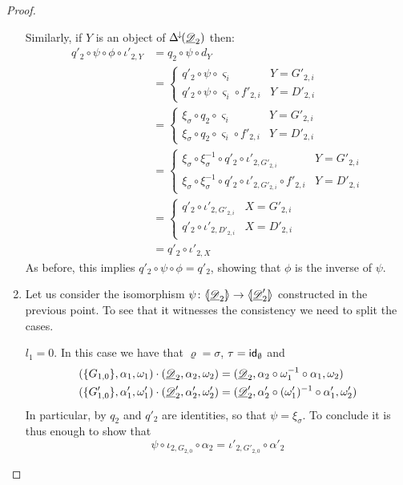 \begin{proof}
\begin{enumerate}
		Similarly, if  $Y$ is an object of $\Delta^{\hspace{-1pt}\downarrow\hspace{-1pt}}(\underline{\mathscr{D}}_2)$ then:
				\begin{align*}
			q'_2\circ \psi \circ \phi \circ \iota'_{2, Y}&=q_2\circ \psi \circ d_Y\\&=\begin{cases}
				q'_2\circ \psi \circ \varsigma_i & Y=G'_{2,i}\\
				q'_2\circ \psi \circ \varsigma_{i} \circ f'_{2,i} & Y=D'_{2,i}
			\end{cases}\\&=\begin{cases}
				\xi_{\sigma} \circ q_2\circ \varsigma_i & Y=G'_{2,i}\\
				\xi_{\sigma} \circ q_2 \circ \varsigma_{i} \circ f'_{2,i} & Y=D'_{2,i}
			\end{cases}\\&=\begin{cases}
				\xi_{\sigma} \circ \xi^{-1}_\sigma \circ q'_2\circ \iota'_{2, G'_{2,i}} & Y=G'_{2,i}\\
				\xi_{\sigma}\circ \xi^{-1}_\sigma \circ  q'_2\circ \iota'_{2, G'_{2,i}}  \circ f'_{2,i} & Y=D'_{2,i}
			\end{cases}\\&=\begin{cases}
				q'_2\circ \iota'_{2, G'_{2,i}} & X=G'_{2,i}\\
				q'_2\circ \iota'_{2, D'_{2,i}} & X=D'_{2,i}
			\end{cases}\\&=q'_2\circ \iota'_{2,X}
		\end{align*}
		As before, this implies $q'_2\circ \psi \circ \phi= q'_2$, showing that $\phi$ is the inverse of $\psi$.
		
		\item Let us consider the isomorphism $\psi \colon \langle \hspace{-1.85pt}[ \underline{\mathscr{D}}_2]\hspace{-1.85pt}\rangle \to \langle \hspace{-1.85pt}[ \underline{\mathscr{D}}'_2]\hspace{-1.85pt}\rangle$ constructed in the previous point. To see that it witnesses the consistency we need to split the cases.
		
		\smallskip \noindent $l_1=0$. In this case we have that $\varrho=\sigma$, $\tau=\mathsf{id}_{\emptyset}$ and 
		\begin{align*}(\{G_{1,0}\}, \alpha_1, \omega_1) \cdot (\underline{\mathscr{D}}_2, \alpha_2, \omega_2)&= (\underline{\mathscr{D}}_2, \alpha_2\circ \omega^{-1}_1\circ \alpha_1, \omega_2)\\(\{G'_{1,0}\}, \alpha'_1, \omega'_1) \cdot (\underline{\mathscr{D}}'_2, \alpha'_2, \omega'_2)&= (\underline{\mathscr{D}}'_2, \alpha'_2\circ (\omega'_1)^{-1}\circ \alpha'_1, \omega'_2)
		\end{align*}
		In particular, by  $q_2$  and $q'_2$ are identities, so that $\psi =\xi_\sigma$. To conclude it is thus enough to show that 
			\[\psi \circ \iota_{2, G_{2,0}} \circ \alpha_2=\iota'_{2, G'_{2,0}}\circ  \alpha'_2\]
		

\end{enumerate}
\end{proof}
